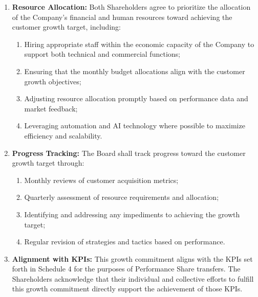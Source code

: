 \begin{enumerate}[label=(\alph*), wide, labelwidth=!, labelindent=0pt]
\begin{enumerate}[label=(\roman*)]
    \end{enumerate}
\item \textbf{Resource Allocation:} Both Shareholders agree to prioritize the allocation of the Company's financial and human resources toward achieving the customer growth target, including:
    \begin{enumerate}[label=(\roman*)]
    \item Hiring appropriate staff within the economic capacity of the Company to support both technical and commercial functions;
    \item Ensuring that the monthly budget allocations align with the customer growth objectives;
    \item Adjusting resource allocation promptly based on performance data and market feedback;
    \item Leveraging automation and AI technology where possible to maximize efficiency and scalability.
    \end{enumerate}
\item \textbf{Progress Tracking:} The Board shall track progress toward the customer growth target through:
    \begin{enumerate}[label=(\roman*)]
    \item Monthly reviews of customer acquisition metrics;
    \item Quarterly assessment of resource requirements and allocation;
    \item Identifying and addressing any impediments to achieving the growth target;
    \item Regular revision of strategies and tactics based on performance.
    \end{enumerate}
\item \textbf{Alignment with KPIs:} This growth commitment aligns with the KPIs set forth in Schedule 4 for the purposes of Performance Share transfers. The Shareholders acknowledge that their individual and collective efforts to fulfill this growth commitment directly support the achievement of those KPIs.
\end{enumerate}

